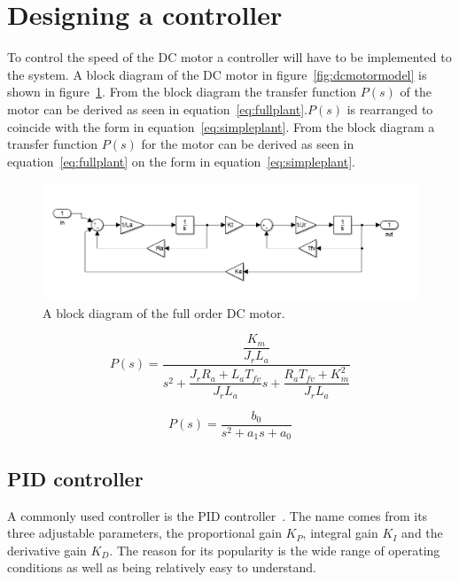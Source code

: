 \section{Designing a controller}
\label{sec:controller}


To control the speed of the DC motor a controller will have to be implemented to the system. A block diagram of the DC motor in figure~\ref{fig:dcmotormodel} is shown in figure~\ref{fig:dcblock}. From the block diagram the transfer function $P(s)$ of the motor can be derived as seen in equation~\ref{eq:fullplant}.$P(s)$ is rearranged to coincide with the form in equation~\ref{eq:simpleplant}. From the block diagram a transfer function $P(s)$ for the motor can be derived as seen in equation~\ref{eq:fullplant} on the form in equation~\ref{eq:simpleplant}.

\begin{figure}[!h]
	\centering
	\includegraphics[width=1\linewidth]{graphics/dcblockdiagram}
	\caption{A block diagram of the full order DC motor.}
	\label{fig:dcblock}
\end{figure}


\begin{equation}
\label{eq:fullplant}
P(s) = \dfrac{\dfrac{K_m}{J_r L_a}}{s^2 + \dfrac{J_r R_a + L_a T_{fv}}{J_r L_a}s + \dfrac{R_a T_{fv} +K_m^2}{J_r L_a}}
\end{equation}

\begin{equation}
\label{eq:simpleplant}
P(s) = \dfrac{b_0}{s^2 + a_1 s + a_0}
\end{equation}


\subsection{PID controller}
 A commonly used controller is the PID controller~\cite{feedback}. 
 The name comes from its three adjustable parameters, the proportional gain $K_{P}$, integral gain $K_{I}$ and the derivative gain $K_{D}$. 
 The reason for its popularity is the wide range of operating conditions as well as being relatively easy to understand. 
 
